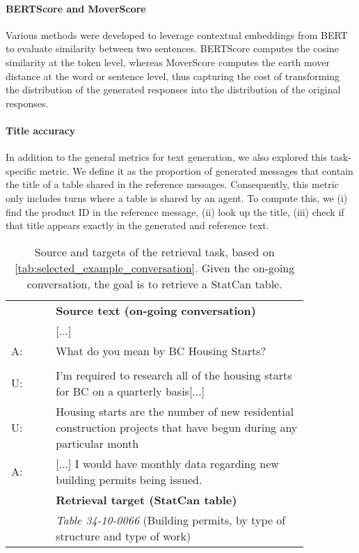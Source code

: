 \documentclass[11pt]{article}
\begin{document}
\paragraph{BERTScore and MoverScore} Various methods were developed to leverage contextual embeddings from BERT \citep{devlin_bert_2019} to evaluate similarity between two sentences. BERTScore \cite{zhang_bertscore_2019} computes the cosine similarity at the token level, whereas MoverScore \citep{zhao_moverscore_2019} computes the earth mover distance \citep{rubner_earth_2000} at the word or sentence level, thus capturing the cost of transforming the distribution of the generated responses into the distribution of the original responses.


\paragraph{Title accuracy} In addition to the general metrics for text generation, we also explored this task-specific metric. We define it as the proportion of generated messages that contain the title of a table shared in the reference messages. Consequently, this metric only includes turns where a table is shared by an agent. To compute this, we (i) find the product ID in the reference message, (ii) look up the title, (iii) check if that title appears exactly in the generated and reference text.

\begin{table}[t]
    \small
    \centering
    \begin{tabular}{l p{0.85\linewidth}}
    \toprule
       & \textbf{Source text (on-going conversation)} \\
       & [...]\\
    A: & What do you mean by BC Housing Starts? \\
    \\
    U: & I'm required to research all of the housing starts for BC on a quarterly basis[...]\\
    U: & Housing starts are the number of new residential construction projects that have begun during any particular month\\
    A: & [...] I would have monthly data regarding new building permits being issued.\\
    \midrule
       & \textbf{Retrieval target (StatCan table)}\\
       & \textit{Table 34-10-0066} (Building permits, by type of structure and type of work)\\
    \bottomrule
    \end{tabular}
    \caption{Source and targets of the retrieval task, based on \autoref{tab:selected_example_conversation}. Given the on-going conversation, the goal is to retrieve a StatCan table. \vspace{-2mm}
    }
    \label{tab:example_retrieval_task}
\end{table}
\end{document}
